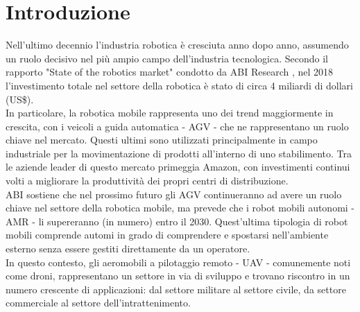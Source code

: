
\chapter{Introduzione}\label{ch:intro}
Nell'ultimo decennio l'industria robotica è cresciuta anno dopo anno, assumendo un ruolo decisivo nel più ampio campo dell'industria tecnologica. Secondo il rapporto "State of the robotics market" condotto da ABI Research \cite{ABI}, nel 2018 l'investimento totale nel settore della robotica è stato di circa 4 miliardi di dollari (US\$).\\

In particolare, la robotica mobile rappresenta uno dei trend maggiormente in crescita, con i veicoli a guida automatica - \ac{AGV} - che ne rappresentano un ruolo chiave nel mercato. Questi ultimi sono utilizzati principalmente in campo industriale per la movimentazione di prodotti all'interno di uno stabilimento. Tra le aziende leader di questo mercato primeggia Amazon, con investimenti continui volti a migliorare la produttività dei propri centri di distribuzione.\\

ABI sostiene che nel prossimo futuro gli \acs{AGV} continueranno ad avere un ruolo chiave nel settore della robotica mobile, ma prevede che i robot mobili autonomi - \ac{AMR} - li supereranno (in numero) entro il 2030. Quest'ultima tipologia di robot mobili comprende automi in grado di comprendere e spostarsi nell'ambiente esterno senza essere gestiti direttamente da un operatore.\\

In questo contesto, gli aeromobili a pilotaggio remoto - \ac{UAV} - comunemente noti come droni, rappresentano un settore in via di sviluppo e trovano riscontro in un numero crescente di applicazioni: dal settore militare al settore civile, da settore commerciale al settore dell'intrattenimento.


